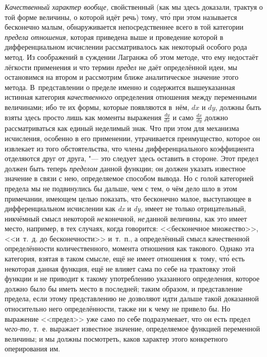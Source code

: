 {\em Качественный характер вообще,} свойственный (как мы здесь доказали,
трактуя о той форме величины, о которой идёт речь) тому, чт\'{о} при этом
называется бесконечно малым, обнаруживается непосредственнее всего в той
категории {\em предела отношения,} которая приведена выше и проведение которой
в дифференциальном исчислении рассматривалось как некоторый особого рода метод.
Из соображений в суждении Лагранжа об этом методе, что ему недостаёт лёгкости
применения и что термин {\em предел} не даёт определённой идеи, мы
остановимся на втором и рассмотрим ближе аналитическое значение этого метода.
В~представлении о пределе именно и содержится вышеуказанная истинная категория
{\em качественного} определения отношения между переменными величинами; ибо те
их формы, которые появляются в~нём, $dx$ и $dy$, должны быть взяты
здесь просто лишь как моменты выражения $\frac{dy}{dx}$ и само $\frac{dx}{dy}$
должно рассматриваться как единый неделимый знак. Что при этом для механизма
исчисления, особенно в его применении, утрачивается преимущество, которое он
извлекает из того обстоятельства, что члены дифференциального коэффициента
отделяются друг от друга, "--- это следует здесь оставить в стороне. Этот
предел должен быть теперь {\em пределом} данной функции; он должен
указать известное значение в связи с нею, определяемое способом вывода. Но с
голой категорией предела мы не подвинулись бы дальше, чем с тем, о чём дело шло
в этом примечании, имеющем целью показать, что бесконечно малое, выступающее в
дифференциальном исчислении как {\em dx} и {\em dy,} имеет не только
отрицательный, никчёмный смысл некоторой {\em не}\,конечной, {\em не}\,данной
величины, как это имеет место, например, в тех случаях, когда говорится:
<<бесконечное множество>>, <<и~т.~д. до бесконечности>> и~т.~п., а определённый
смысл качественной определённости количественного, момента отношения как
такового. Однако эта категория, взятая в таком смысле, ещё не имеет отношения
к~тому, чт\'{о} есть некоторая данная функция, ещё не влияет сама по себе на
трактовку этой функции и не приводит к такому употреблению указанного
определения, которое должно было бы иметь место в последней; таким образом, и
представление предела, если этому представлению не дозволяют идти дальше такой
доказанной относительно него определённости, также ни к чему не привело бы. Но
выражение <<предел>> уже само по себе подразумевает, что он есть предел
{\em чего-то,} т.~е. выражает известное значение, определяемое функцией
переменной величины; и мы должны посмотреть, каков характер этого конкретного
оперирования им.

